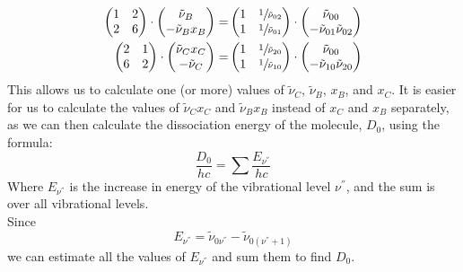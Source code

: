 \documentclass{article}
\begin{document}
\begin{align}
    \begin{pmatrix}
        1 & 2\\
        2 & 6
    \end{pmatrix}
    \cdot
    \begin{pmatrix}
        \tilde{\nu}_B\\
        -\tilde{\nu}_Bx_B
    \end{pmatrix}
    =&
    \begin{pmatrix}
        1&\sfrac{1}{\tilde{\nu}_{02}}\\
        1&\sfrac{1}{\tilde{\nu}_{01}}
    \end{pmatrix}
    \cdot
    \begin{pmatrix}
        \tilde{\nu}_{00}\\
        -\tilde{\nu}_{01}\tilde{\nu}_{02}
    \end{pmatrix}\\
    \begin{pmatrix}
        2 & 1\\
        6 & 2
    \end{pmatrix}
    \cdot
    \begin{pmatrix}
        \tilde{\nu}_Cx_C\\
        -\tilde{\nu}_C\\
    \end{pmatrix}
    =&
    \begin{pmatrix}
        1&\sfrac{1}{\tilde{\nu}_{20}}\\
        1&\sfrac{1}{\tilde{\nu}_{10}}
    \end{pmatrix}
    \cdot
    \begin{pmatrix}
        \tilde{\nu}_{00}\\
        -\tilde{\nu}_{10}\tilde{\nu}_{20}
    \end{pmatrix}
\end{align}
This allows us to calculate one (or more) values of $\tilde{\nu}_C$, $\tilde{\nu}_B$, $x_B$, and $x_C$.  It is easier for us to calculate the values of $\tilde{\nu}_Cx_C$ and $\tilde{\nu}_Bx_B$ instead of $x_C$ and $x_B$ separately, as we can then calculate the dissociation energy of the molecule, $D_0$, using the formula:
\begin{equation}
    \label{eq: dissociationEnergy}
    \frac{D_0}{hc} = \sum \frac{E_{\nu^{''}}}{hc}
\end{equation}
Where $E_{\nu^{''}}$ is the increase in energy of the vibrational level $\nu^{''}$, and the sum is over all vibrational levels.\\
\indent Since 
\begin{equation}
    \label{eq: energyIncrease}
    E_{\nu^{''}} = \tilde{\nu}_{0\nu^{''}} - \tilde{\nu}_{0(\nu^{''}+1)}
\end{equation}
we can estimate all the values of $E_{\nu^{''}}$ and sum them to find $D_0$.\\
\end{document}
